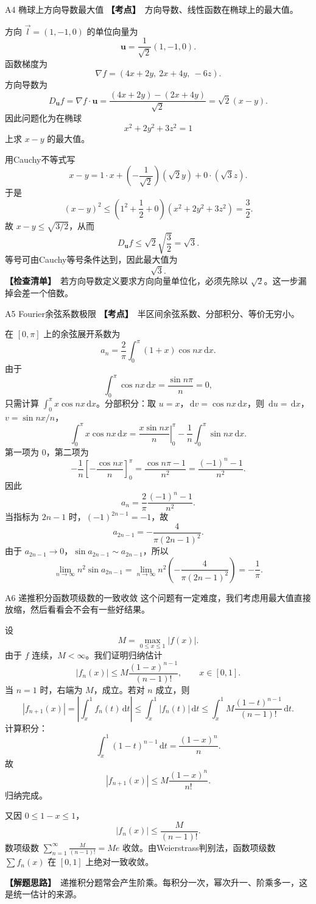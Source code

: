 \documentclass[UTF8,zihao=-4,openany]{ctexbook}
\newcommand{\dd}{\,\mathrm{d}}
\newcommand{\grad}{\nabla}
\newcommand{\thinking}{\textcolor{mainblue}{\bfseries【解题思路】}}
\newcommand{\point}{\textcolor{warnred}{\bfseries【考点】}}
\newcommand{\checklist}{\textcolor{theogreen}{\bfseries【检查清单】}}
\begin{document}
\begin{solutionbox}{A4 椭球上方向导数最大值}
\point\ 方向导数、线性函数在椭球上的最大值。

方向 $\vec l=(1,-1,0)$ 的单位向量为
\[
\bm u=\frac{1}{\sqrt2}(1,-1,0).
\]
函数梯度为
\[
\grad f=(4x+2y,\ 2x+4y,\ -6z).
\]
方向导数为
\[
D_{\bm u}f=\grad f\cdot\bm u
=\frac{(4x+2y)-(2x+4y)}{\sqrt2}
=\sqrt2(x-y).
\]
因此问题化为在椭球
\[
x^2+2y^2+3z^2=1
\]
上求 $x-y$ 的最大值。

用Cauchy不等式写
\[
x-y=1\cdot x+\left(-\frac1{\sqrt2}\right)(\sqrt2y)+0\cdot(\sqrt3z).
\]
于是
\[
(x-y)^2\le \left(1^2+\frac12+0\right)(x^2+2y^2+3z^2)=\frac32.
\]
故 $x-y\le\sqrt{3/2}$，从而
\[
D_{\bm u}f\le \sqrt2\sqrt{\frac32}=\sqrt3.
\]
等号可由Cauchy等号条件达到，因此最大值为
\[
\boxed{\sqrt3}.
\]
\checklist\ 若方向导数定义要求方向向量单位化，必须先除以 $\sqrt2$。这一步漏掉会差一个倍数。
\end{solutionbox}

\begin{solutionbox}{A5 Fourier余弦系数极限}
\point\ 半区间余弦系数、分部积分、等价无穷小。

在 $[0,\pi]$ 上的余弦展开系数为
\[
a_n=\frac2\pi\int_0^\pi(1+x)\cos nx\dd x.
\]
由于
\[
\int_0^\pi \cos nx\dd x=\frac{\sin n\pi}{n}=0,
\]
只需计算 $\int_0^\pi x\cos nx\dd x$。分部积分：取 $u=x$，$\dd v=\cos nx\dd x$，则 $\dd u=\dd x$，$v=\sin nx/n$，
\[
\int_0^\pi x\cos nx\dd x=\left.\frac{x\sin nx}{n}\right|_0^\pi-\frac1n\int_0^\pi\sin nx\dd x.
\]
第一项为 $0$，第二项为
\[
-\frac1n\left[-\frac{\cos nx}{n}\right]_0^\pi
=\frac{\cos n\pi-1}{n^2}=\frac{(-1)^n-1}{n^2}.
\]
因此
\[
a_n=\frac2\pi\frac{(-1)^n-1}{n^2}.
\]
当指标为 $2n-1$ 时，$(-1)^{2n-1}=-1$，故
\[
a_{2n-1}= -\frac{4}{\pi(2n-1)^2}.
\]
由于 $a_{2n-1}\to0$，$\sin a_{2n-1}\sim a_{2n-1}$，所以
\[
\lim_{n\to\infty}n^2\sin a_{2n-1}
=\lim_{n\to\infty}n^2\left(-\frac{4}{\pi(2n-1)^2}\right)
=\boxed{-\frac1\pi}.
\]
\end{solutionbox}

\begin{solutionbox}{A6 递推积分函数项级数的一致收敛}
这个问题有一定难度，我们考虑用最大值直接放缩，然后看看会不会有一些好结果。

设
\[
M=\max_{0\le x\le1}|f(x)|.
\]
由于 $f$ 连续，$M<\infty$。我们证明归纳估计
\[
|f_n(x)|\le M\frac{(1-x)^{n-1}}{(n-1)!},\qquad x\in[0,1].
\]
当 $n=1$ 时，右端为 $M$，成立。若对 $n$ 成立，则
\[
|f_{n+1}(x)|=\left|\int_x^1 f_n(t)\dd t\right|
\le\int_x^1 |f_n(t)|\dd t
\le \int_x^1 M\frac{(1-t)^{n-1}}{(n-1)!}\dd t.
\]
计算积分：
\[
\int_x^1(1-t)^{n-1}\dd t=\frac{(1-x)^n}{n}.
\]
故
\[
|f_{n+1}(x)|\le M\frac{(1-x)^n}{n!}.
\]
归纳完成。

又因 $0\le1-x\le1$，
\[
|f_n(x)|\le \frac{M}{(n-1)!}.
\]
数项级数 $\sum_{n=1}^{\infty}\frac{M}{(n-1)!}=Me$ 收敛。由Weierstrass判别法，函数项级数 $\sum f_n(x)$ 在 $[0,1]$ 上绝对一致收敛。

\thinking\ 递推积分题常会产生阶乘。每积分一次，幂次升一、阶乘多一，这是统一估计的来源。
\end{solutionbox}
\end{document}
